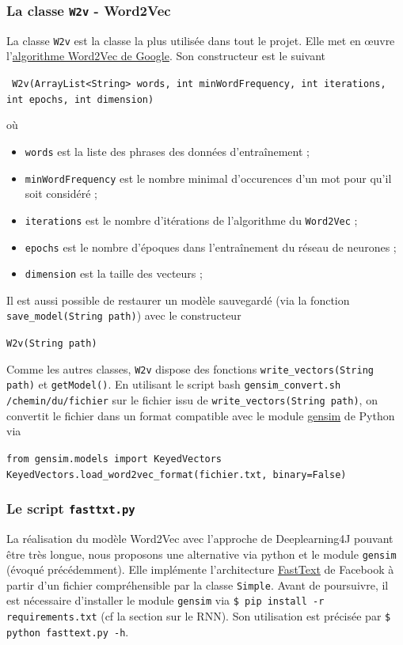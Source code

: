 \documentclass[10pt,a4paper]{article}
\newcommand\tab[1][0.5cm]{\hspace*{#1}}
\begin{document}
\subsubsection{La classe \texttt{W2v} - Word2Vec}
La classe \texttt{W2v} est la classe la plus utilisée dans tout le projet. Elle met en œuvre l'\href{https://patents.google.com/patent/US9037464B1/en}{algorithme Word2Vec de Google}. Son constructeur est le suivant
\begin{center}
	\texttt{ W2v(ArrayList<String> words, int minWordFrequency, int iterations, int epochs, int dimension)}
\end{center}
où
\begin{itemize}
	\item \texttt{words} est la liste des phrases des données d'entraînement ;
	\item \texttt{minWordFrequency} est le nombre minimal d'occurences d'un mot pour qu'il soit considéré ;
	\item \texttt{iterations} est le nombre d'itérations de l'algorithme du \texttt{Word2Vec} ;
	\item \texttt{epochs} est le nombre d'époques dans l'entraînement du réseau de neurones ;
	\item \texttt{dimension} est la taille des vecteurs ;
\end{itemize}
Il est aussi possible de restaurer un modèle sauvegardé (via la fonction \texttt{save\_model(String path)}) avec le constructeur
\begin{center}
	\texttt{W2v(String path)}
\end{center}
\tab Comme les autres classes, \texttt{W2v} dispose des fonctions \texttt{write\_vectors(String path)} et \texttt{getModel()}. En utilisant le script bash \texttt{gensim\_convert.sh /chemin/du/fichier} sur le fichier issu de \texttt{write\_vectors(String path)}, on convertit le fichier dans un format compatible avec le module \href{https://pypi.org/project/gensim/}{gensim} de Python via
\begin{center}
	\texttt{from gensim.models import KeyedVectors} \\
	\texttt{KeyedVectors.load\_word2vec\_format(fichier.txt, binary=False)}
\end{center}
\subsubsection{Le script \texttt{fasttxt.py}}
La réalisation du modèle Word2Vec avec l'approche de Deeplearning4J pouvant être très longue, nous proposons une alternative via python et le module \texttt{gensim} (évoqué précédemment). Elle implémente l'architecture \href{https://fasttext.cc/}{FastText} de Facebook à partir d'un fichier compréhensible par la classe \texttt{Simple}. Avant de poursuivre, il est nécessaire d'installer le module \texttt{gensim} via \texttt{\$ pip install -r requirements.txt} (cf la section sur le RNN). Son utilisation est précisée par \texttt{\$ python fasttext.py -h}.
\end{document}
